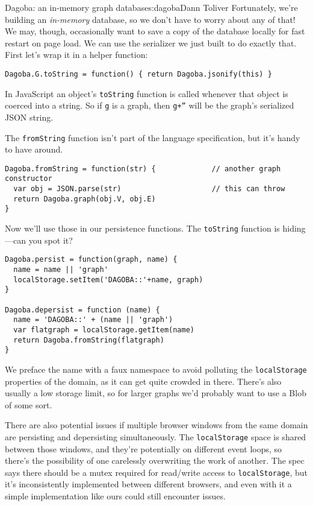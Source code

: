 \begin{aosachapter}{Dagoba: an in-memory graph database}{s:dagoba}{Dann Toliver}
Fortunately, we're building an \emph{in-memory} database, so we don't
have to worry about any of that! We may, though, occasionally want to
save a copy of the database locally for fast restart on page load. We
can use the serializer we just built to do exactly that. First let's
wrap it in a helper function:

\begin{verbatim}
Dagoba.G.toString = function() { return Dagoba.jsonify(this) }
\end{verbatim}

In JavaScript an object's \texttt{toString} function is called whenever
that object is coerced into a string. So if \texttt{g} is a graph, then
\texttt{g+''} will be the graph's serialized JSON string.

The \texttt{fromString} function isn't part of the language
specification, but it's handy to have around.

\begin{verbatim}
Dagoba.fromString = function(str) {             // another graph constructor
  var obj = JSON.parse(str)                     // this can throw
  return Dagoba.graph(obj.V, obj.E)
}
\end{verbatim}

Now we'll use those in our persistence functions. The \texttt{toString}
function is hiding---can you spot it?

\begin{verbatim}
Dagoba.persist = function(graph, name) {
  name = name || 'graph'
  localStorage.setItem('DAGOBA::'+name, graph)
}

Dagoba.depersist = function (name) {
  name = 'DAGOBA::' + (name || 'graph')
  var flatgraph = localStorage.getItem(name)
  return Dagoba.fromString(flatgraph)
}
\end{verbatim}

We preface the name with a faux namespace to avoid polluting the
\texttt{localStorage} properties of the domain, as it can get quite
crowded in there. There's also usually a low storage limit, so for
larger graphs we'd probably want to use a Blob of some sort.

There are also potential issues if multiple browser windows from the
same domain are persisting and depersisting simultaneously. The
\texttt{localStorage} space is shared between those windows, and they're
potentially on different event loops, so there's the possibility of one
carelessly overwriting the work of another. The spec says there should
be a mutex required for read/write access to \texttt{localStorage}, but
it's inconsistently implemented between different browsers, and even
with it a simple implementation like ours could still encounter issues.


\end{aosachapter}
